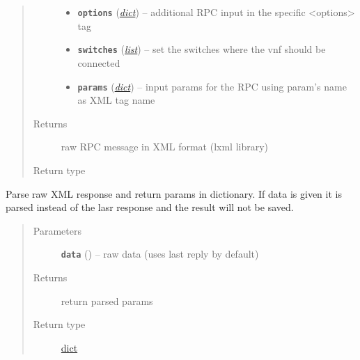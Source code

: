 \documentclass[letterpaper,10pt,english]{sphinxmanual}
\begin{document}
\begin{fulllineitems}
\begin{fulllineitems}
\begin{quote}
\begin{description}
\begin{itemize}
\item {} 
\textbf{\texttt{options}} (\href{https://docs.python.org/2.7/library/stdtypes.html\#dict}{\emph{dict}}) -- additional RPC input in the specific \textless{}options\textgreater{} tag

\item {} 
\textbf{\texttt{switches}} (\href{https://docs.python.org/2.7/library/functions.html\#list}{\emph{list}}) -- set the switches where the vnf should be connected

\item {} 
\textbf{\texttt{params}} (\href{https://docs.python.org/2.7/library/stdtypes.html\#dict}{\emph{dict}}) -- input params for the RPC using param's name as XML tag name

\end{itemize}

\item[{Returns}] \leavevmode
raw RPC message in XML format (lxml library)

\item[{Return type}] \leavevmode
{}

\end{description}\end{quote}

\end{fulllineitems}


\begin{fulllineitems}
\label{util/netconf:escape.util.netconf.AbstractNETCONFAdapter._parse_rpc_response}
Parse raw XML response and return params in dictionary. If data is given
it is parsed instead of the lasr response and the result will not be saved.
\begin{quote}\begin{description}
\item[{Parameters}] \leavevmode
\textbf{\texttt{data}} () -- raw data (uses last reply by default)

\item[{Returns}] \leavevmode
return parsed params

\item[{Return type}] \leavevmode
\href{https://docs.python.org/2.7/library/stdtypes.html\#dict}{dict}

\end{description}\end{quote}


\end{fulllineitems}
\end{fulllineitems}
\end{document}
